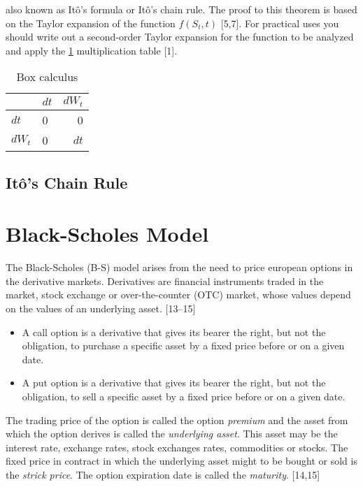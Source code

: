 \documentclass[12pt,twoside]{reedthesis}
\theoremstyle{definition}
\theoremstyle{definition}
\theoremstyle{remark}
\begin{document}
  also known as Itô's formula or Itô's chain rule. The proof to this
  theorem is based on the Taylor expansion of the function \(f(S_t, t)\)
  {[}5,7{]}. For practical uses you should write out a second-order Taylor
  expansion for the function to be analyzed and apply the
  \ref{tab:box-calc} multiplication table {[}1{]}.
  \begin{longtable}[t]{llr}
  \caption{\label{tab:box-calc}Box calculus}\\
  \toprule
    & $dt$ & $dW_t$\\
  \midrule
  $dt$ & 0 & 0\\
  $dW_t$ & 0 & $dt$\\
  \bottomrule
  \end{longtable}
  \subsection{Itô's Chain Rule}\label{itos-chain-rule}
  
  \section{Black-Scholes Model}\label{black-scholes-model}
  
  The Black-Scholes (B-S) model arises from the need to price european
  options in the derivative markets. Derivatives are financial instruments
  traded in the market, stock exchange or over-the-counter (OTC) market,
  whose values depend on the values of an underlying asset. {[}13--15{]}
  \begin{itemize}
  \item
    A call option is a derivative that gives its bearer the right, but not
    the obligation, to purchase a specific asset by a fixed price before
    or on a given date.
  \item
    A put option is a derivative that gives its bearer the right, but not
    the obligation, to sell a specific asset by a fixed price before or on
    a given date.
  \end{itemize}
  The trading price of the option is called the option \emph{premium} and
  the asset from which the option derives is called the \emph{underlying
  asset}. This asset may be the interest rate, exchange rates, stock
  exchanges rates, commodities or stocks. The fixed price in contract in
  which the underlying asset might to be bought or sold is the
  \emph{strick price}. The option expiration date is called the
  \emph{maturity}. {[}14,15{]}
  
\end{document}
